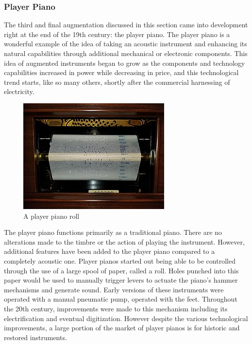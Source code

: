 \subsubsection{Player Piano}

The third and final augmentation discussed in this section came into development right at the end of the 19th century: the player piano. The player piano is a wonderful example of the idea of taking an acoustic instrument and enhancing its natural capabilities through additional mechanical or electronic components. This idea of augmented instruments began to grow as the components and technology capabilities increased in power while decreasing in price, and this technological trend starts, like so many others, shortly after the commercial harnessing of electricity.

\begin{figure}
    \centering
    \includegraphics[scale=0.8]{diagrams/PlayerPianoRoll.jpg}
    \caption{A player piano roll}
    \label{fig:pianoroll}
\end{figure}

The player piano functions primarily as a traditional piano. There are no alterations made to the timbre or the action of playing the instrument. However, additional features have been added to the player piano compared to a completely acoustic one. Player pianos started out being able to be controlled through the use of a large spool of paper, called a roll. Holes punched into this paper would be used to manually trigger levers to actuate the piano's hammer mechanisms and generate sound. Early versions of these instruments were operated with a manual pneumatic pump, operated with the feet. Throughout the 20th century, improvements were made to this mechanism including its electrification and eventual digitization. However despite the various technological improvements, a large portion of the market of player pianos is for historic and restored instruments.

